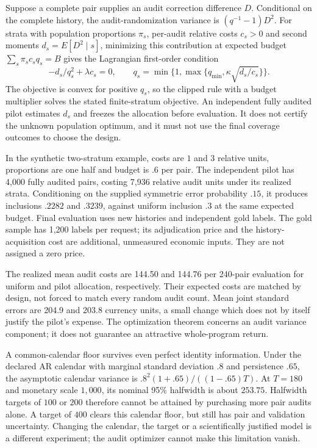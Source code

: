 Suppose a complete pair supplies an audit correction difference $D$. Conditional
on the complete history, the audit-randomization variance is
$(q^{-1}-1)D^2$. For strata with population proportions $\pi_s$, per-audit
relative costs $c_s>0$ and second moments $d_s=E[D^2\mid s]$, minimizing this
contribution at expected budget $\sum_s\pi_sc_sq_s=B$ gives the Lagrangian
first-order condition
\[
 -d_s/q_s^2+\lambda c_s=0,\qquad
 q_s=\min\{1,\max\{q_{\min},\kappa\sqrt{d_s/c_s}\}\}.
\]
The objective is convex for positive $q_s$, so the clipped rule with a budget
multiplier solves the stated finite-stratum objective. An independent fully
audited pilot estimates $d_s$ and freezes the allocation before evaluation.
It does not certify the unknown population optimum, and it must not use the
final coverage outcomes to choose the design.

In the synthetic two-stratum example, costs are $1$ and $3$ relative units,
proportions are one half and budget is $.6$ per pair. The independent pilot has
4,000 fully audited pairs, costing 7,936 relative audit units under its realized
strata. Conditioning on the supplied symmetric error probability $.15$, it
produces inclusions $.2282$ and $.3239$, against uniform inclusion $.3$ at the
same expected budget. Final evaluation uses new histories and independent
gold labels. The gold sample has 1,200 labels per request; its adjudication
price and the history-acquisition cost are additional, unmeasured economic
inputs. They are not assigned a zero price.

The realized mean audit costs are 144.50 and 144.76 per 240-pair evaluation for
uniform and pilot allocation, respectively. Their expected costs are matched
by design, not forced to match every random audit count. Mean joint standard
errors are 204.9 and 203.8 currency units, a small change which does not by
itself justify the pilot's expense. The optimization theorem concerns an audit
variance component; it does not guarantee an attractive whole-program return.

A common-calendar floor survives even perfect identity information. Under the
declared AR calendar with marginal standard deviation $.8$ and persistence $.65$,
the asymptotic calendar variance is
$.8^2(1+.65)/((1-.65)T)$. At $T=180$ and monetary scale $1,000$, its nominal
95\% halfwidth is about $253.75$. Halfwidth targets of $100$ or $200$ therefore
cannot be attained by purchasing more pair audits alone. A target of $400$
clears this calendar floor, but still has pair and validation uncertainty.
Changing the calendar, the target or a scientifically justified model is a
different experiment; the audit optimizer cannot make this limitation vanish.

